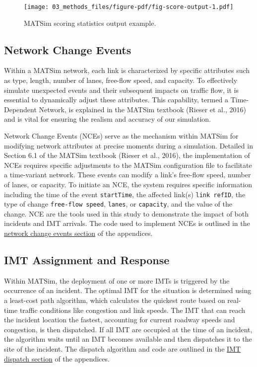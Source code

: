 \documentclass[fancy, oneside, mastersfancy, ms]{byuthesis}
\begin{document}
\begin{figure}

{\centering \texttt{[image: 03\_methods\_files/figure-pdf/fig-score-output-1.pdf]}

}

\caption{\label{fig-score-output}MATSim scoring statistics output
example.}

\end{figure}

\hypertarget{sec-NCE}{%
\subsection{Network Change Events}\label{sec-NCE}}

Within a MATSim network, each link is characterized by specific
attributes such as type, length, number of lanes, free-flow speed, and
capacity. To effectively simulate unexpected events and their subsequent
impacts on traffic flow, it is essential to dynamically adjust these
attributes. This capability, termed a Time-Dependent Network, is
explained in the MATSim textbook (Rieser et al., 2016) and is vital for
ensuring the realism and accuracy of our simulation.

Network Change Events (NCEs) serve as the mechanism within MATSim for
modifying network attributes at precise moments during a simulation.
Detailed in Section 6.1 of the MATSim textbook (Rieser et al., 2016),
the implementation of NCEs requires specific adjustments to the MATSim
configuration file to facilitate a time-variant network. These events
can modify a link's free-flow speed, number of lanes, or capacity. To
initiate an NCE, the system requires specific information including the
time of the event \texttt{startTime}, the affected link(s)
\texttt{link\ refID}, the type of change \texttt{free-flow\ speed},
\texttt{lanes}, or \texttt{capacity}, and the value of the change. NCE
are the tools used in this study to demonstrate the impact of both
incidents and IMT arrivals. The code used to implement NCEs is outlined
in the \protect\hyperlink{sec-apend_nce}{network change events section}
of the appendices.

\hypertarget{sec-imt_response}{%
\subsection{IMT Assignment and Response}\label{sec-imt_response}}

Within MATSim, the deployment of one or more IMTs is triggered by the
occurrence of an incident. The optimal IMT for the situation is
determined using a least-cost path algorithm, which calculates the
quickest route based on real-time traffic conditions like congestion and
link speeds. The IMT that can reach the incident location the fastest,
accounting for current roadway speeds and congestion, is then
dispatched. If all IMT are occupied at the time of an incident, the
algorithm waits until an IMT becomes available and then dispatches it to
the site of the incident. The dispatch algorithm and code are outlined
in the \protect\hyperlink{sec-imt_dispatch}{IMT dispatch section} of the
appendices.
\end{document}
